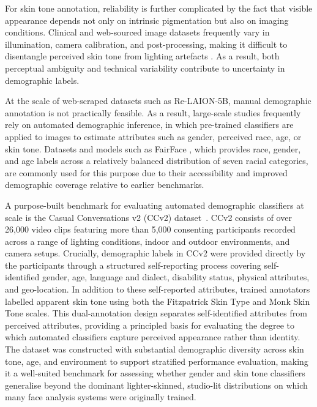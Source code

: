 For skin tone annotation, reliability is further complicated by the fact that visible appearance depends not only on intrinsic pigmentation but also on imaging conditions. Clinical and web-sourced image datasets frequently vary in illumination, camera calibration, and post-processing, making it difficult to disentangle perceived skin tone from lighting artefacts \cite{Groh_2021_Fitzpatrick17k}. As a result, both perceptual ambiguity and technical variability contribute to uncertainty in demographic labels.

At the scale of web-scraped datasets such as Re-LAION-5B, manual demographic annotation is not practically feasible. As a result, large-scale studies frequently rely on automated demographic inference, in which pre-trained classifiers are applied to images to estimate attributes such as gender, perceived race, age, or skin tone. Datasets and models such as FairFace \cite{Karkkainen_2021_FairFace}, which provides race, gender, and age labels across a relatively balanced distribution of seven racial categories, are commonly used for this purpose due to their accessibility and improved demographic coverage relative to earlier benchmarks.

A purpose-built benchmark for evaluating automated demographic classifiers
at scale is the Casual Conversations v2 (CCv2) dataset~\cite{Porgali_2023_CCv2}.
CCv2 consists of over 26,000 video clips featuring more than 5,000
consenting participants recorded across a range of lighting conditions,
indoor and outdoor environments, and camera setups. Crucially, demographic
labels in CCv2 were provided directly by the participants through a
structured self-reporting process covering self-identified gender,
age, language and dialect, disability status, physical attributes,
and geo-location. In addition to these self-reported attributes,
trained annotators labelled apparent skin tone using both the
Fitzpatrick Skin Type and Monk Skin Tone scales. This dual-annotation
design separates self-identified attributes from perceived attributes,
providing a principled basis for evaluating the degree to which automated
classifiers capture perceived appearance rather than identity. The dataset
was constructed with substantial demographic diversity across skin tone,
age, and environment to support stratified performance evaluation, making
it a well-suited benchmark for assessing whether gender and skin tone
classifiers generalise beyond the dominant lighter-skinned, studio-lit
distributions on which many face analysis systems were originally trained.

